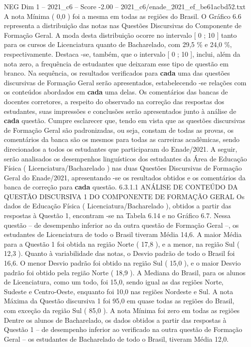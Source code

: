\begin{textsample}{NEG Dim 1 – 2021\_c6 – Score -2.00 – 2021\_c6/enade\_2021\_ef\_be61acbd52.txt}
A nota Mínima ( 0,0 ) foi a mesma em todas as regiões do Brasil.
O Gráfico 6.6 representa a distribuição das notas nas Questões Discursivas do Componente de Formação Geral.
A moda desta distribuição ocorre no intervalo [ 0 ; 10 ] tanto para os cursos de Licenciatura quanto de Bacharelado, com 29,5 \% e 24,0 \%, respectivamente.
Destaca -se, também, que o intervalo [ 0 ; 10 ], inclui, além da nota zero, a frequência de estudantes que deixaram esse tipo de questão em branco.
Na sequência, os resultados verificados para \textbf{cada} uma das questões discursivas de Formação Geral serão apresentados, estabelecendo -se relações com os conteúdos abordados em \textbf{cada} uma delas.
Os comentários das bancas de docentes corretores, a respeito do observado na correção das respostas dos estudantes, suas impressões e conclusões serão apresentados junto à análise de \textbf{cada} questão.
Cumpre esclarecer que, tendo em vista que as questões discursivas de Formação Geral são padronizadas, ou seja, constam de todas as provas, os comentários da banca são os mesmos para todas as carreiras acadêmicas, sendo direcionados a todos os estudantes que participaram do Enade/2021.
A seguir, serão analisados os desempenhos linguísticos dos estudantes da Área de Educação Física ( Licenciatura/Bacharelado ) nas duas Questões Discursivas de Formação Geral do Enade/2021, apresentando -se os resultados obtidos e os comentários da banca de correção para \textbf{cada} questão. 6.3.1.1 ANÁLISE DE CONTEÚDO DA QUESTÃO DISCURSIVA 1 DO COMPONENTE DE FORMAÇÃO GERAL Os dados de Educação Física ( Licenciatura/Bacharelado ), obtidos a partir das respostas à Questão 1, encontram -se na Tabela 6.14 e no Gráfico 6.7.
Nessa questão – de desempenho inferior ao da outra questão de Formação Geral –, os estudantes de Licenciatura de todo o Brasil tiveram Média 14,6.
A maior Média para a Questão 1 foi obtida na região Norte ( 17,8 ), e a menor, na região Sul ( 12,3 ).
Quanto à variabilidade das notas, o Desvio padrão de todo o Brasil foi 16,6.
O menor Desvio padrão foi obtido na região Sul ( 15,0 ), e o maior Desvio padrão foi obtido pela região Norte ( 18,9 ).
A Mediana do Brasil, para os alunos de Licenciatura, como um todo, foi 15,0, sendo igual as das regiões Norte, Sudeste e Centro-Oeste, enquanto foi 10,0 nas regiões Nordeste e Sul.
A nota Máxima da Questão discursiva 1 foi 95,0 em quase todas as regiões do Brasil, com exceção da região Sul ( 85,0 ).
A nota Mínima foi zero em todas as regiões Dentre os alunos de Bacharelado, os dados obtidos a partir das respostas à Questão 1 – de desempenho inferior ao verificado na outra questão de Formação Geral – os estudantes de Bacharelado de todo o Brasil, tiveram Média 12,0.

\end{textsample}
